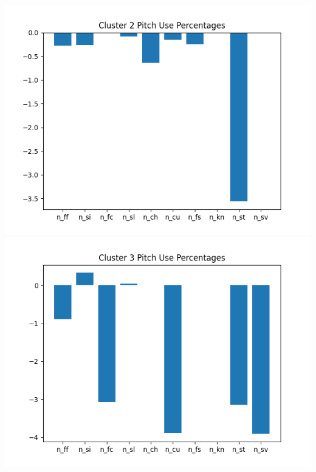 \documentclass[12 pt]{article}
\begin{document}
\begin{center}
\\ \includegraphics[scale=.425]{figs/pct2_8.png} \includegraphics[scale=.425]{figs/pct3_8.png}

\end{center}
\end{document}
